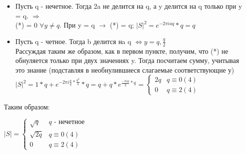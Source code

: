 \begin{itemize}
    \item Пусть q - нечетное. Тогда  2a не делится на q, а y делится на q только при y = q. $\Longrightarrow$ \\ (*) = 0 $\forall y \neq q$. При y = q $\longrightarrow$ (*) = q; $|S|^2 = e^{-2\pi i a q} * q = q$
    \item Пусть q - четное. Тогда b делится нa q $\Longleftrightarrow y = q, \frac{q}{2}$ \\Рассуждая таким же образом, как в первом пункте, получим, что (*) не обнуляется только при двух значениях y. Тогда посчитаем сумму, учитывая это знание (подставляя в необнулившиеся слагаемые соответствующие у)
    $|S|^2 = 1*q + e^{-2 \pi i \frac{a}{q}*\frac{q^2}{4}} * q = q + q*e^{\frac{-\pi i a}{2}*q}$ =
 $\begin{cases}
    2q & q \equiv 0(4)
    \\
    0 & q \equiv 2(4)
 \end{cases}$
\end{itemize}

Таким образом:

$|S| = \begin{cases}
   \sqrt{q} & q \text{ - нечетное}
   \\
   \sqrt{2q} & q \equiv 0(4)
   \\
   0 & q \equiv 2(4)
\end{cases}$